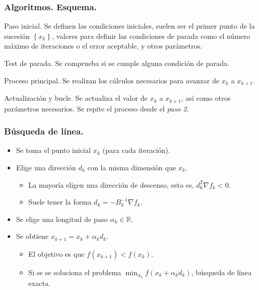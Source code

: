 \documentclass{beamer}
\newcommand{\sucesionxk}{\left\{x_k\right\}}
\begin{document}
\begin{frame}
    \frametitle{Algoritmos. Esquema.}
    \begin{steps}
		\item Paso inicial. Se definen las condiciones iniciales, suelen ser el primer
		punto de la sucesión $\sucesionxk$, valores para definir las condiciones de
		parada como el número máximo de iteraciones o el error aceptable, y otros parámetros.
        \pause
		\item Test de parada. Se comprueba si se cumple alguna condición de parada.
        \pause
		\item Proceso principal. Se realizan los cálculos necesarios para avanzar de
		$x_k$ a $x_{k+1}$.
        \pause
		\item Actualización y bucle. Se actualiza el valor de $x_k$ a $x_{k+1}$, así como otros parámetros necesarios. Se repite el proceso desde el \textit{paso 2.}
	\end{steps}
\end{frame}

\begin{frame}
    \frametitle{Búsqueda de línea.}
    \begin{itemize}[label=\textbullet]
        \item Se toma el punto inicial $x_k$ (para cada iteración).
        \item Elige una dirección $d_k$ con la misma dimensión que $x_k$.
        \begin{itemize}[label=-]
            \item La mayoría eligen una dirección de descenso, esto es, $d_k^T \nabla f_k < 0$.
            \item Suele tener la forma $d_k = -B_k^{-1}\nabla f_k$.
        \end{itemize}
        \item Se elige una longitud de paso $\alpha_k\in \mathbb{R}$.
        \item Se obtiene $x_{k+1} = x_k + \alpha_k d_k$.
        \begin{itemize}[label=-]
            \item El objetivo es que $f(x_{k+1}) < f(x_k)$.
            \item Si se se soluciona el problema $\min_{\alpha_k} f(x_k + \alpha_k d_k)$, búsqueda de línea exacta.
        \end{itemize}
    \end{itemize}
\end{frame}
\end{document}
